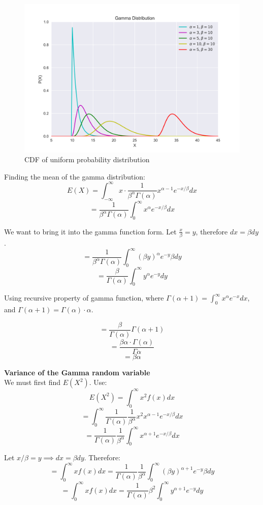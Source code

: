 \begin{figure}[H]
\centering
\includegraphics[width=1\textwidth]{images/gamma-dist.png}
\caption{CDF of uniform probability distribution}
\label{fig:sample}
\end{figure}

Finding the mean of the gamma distribution:
$$E(X) = \int_{-\infty}^{\infty} x \cdot \frac{1}{\beta^{\alpha} \Gamma (\alpha)} x^{\alpha - 1} e^{-x/ \beta} dx$$
$$= \frac{1}{\beta ^\alpha \Gamma (\alpha) } \int_{0}^{\infty} x^{\alpha} e^{-x / \beta} dx$$

We want to bring it into the gamma function form. Let $\frac{x}{\beta} = y$, therefore $dx = \beta dy$.
$$= \frac{1}{\beta ^\alpha \Gamma (\alpha) } \int_{0}^{\infty} (\beta y)^{\alpha} e^{-y} \beta dy$$
$$= \frac{\beta}{\Gamma (\alpha) } \int_{0}^{\infty} y^{\alpha} e^{-y} dy$$

Using recursive property of gamma function, where $\Gamma (\alpha + 1) = \int_{0}^{\infty} x^{\alpha} e^{-x} dx$, and $\Gamma (\alpha + 1) = \Gamma(\alpha) \cdot \alpha $.

$$ = \frac{\beta}{\Gamma (\alpha)} \Gamma (\alpha + 1) $$
$$= \frac{\beta \alpha \cdot \Gamma (\alpha)}{\Gamma \alpha}$$
$$= \beta \alpha$$

\textbf{Variance of the Gamma random variable}\\
We must first find $E(X^2)$. Use:
$$E(X^2) = \int_{0}^{\infty} x^2 f(x) dx$$
$$= \int_{0}^{\infty} \frac{1}{\Gamma (\alpha)} \frac{1}{\beta^{\alpha}} x^2 x^{\alpha - 1} e^{-x / \beta} dx$$
$$= \frac{1}{\Gamma (\alpha)} \frac{1}{\beta^{\alpha}} \int_{0}^{\infty} x^{\alpha + 1} e^{-x / \beta} dx$$

Let $x/ \beta = y \implies dx = \beta dy$. Therefore:
$$= \int_{0}^{\infty} x f(x) dx = \frac{1}{\Gamma (\alpha)} \frac{1}{\beta ^{\alpha}} \int_{0}^{\infty} (\beta y)^{\alpha + 1} e^{-y} \beta dy$$
$$= \int_{0}^{\infty} x f(x) dx = \frac{1}{\Gamma (\alpha)} \beta^2 \int_{0}^{\infty} y^{\alpha + 1} e^{-y} dy$$

